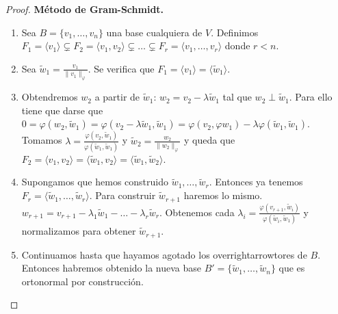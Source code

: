 \documentclass[14pt]{book}
\begin{document}
\begin{proof} \textbf{Método de Gram-Schmidt.}
	\begin{enumerate}
		\item Sea $B = \{v_1, \dots, v_n\}$ una base cualquiera de $V$. Definimos $F_1 = \langle v_1\rangle\subsetneq F_2 = \langle v_1, v_2\rangle \subsetneq \dots \subsetneq F_r = \langle v_1, \dots, v_r\rangle$ donde $r < n$.
		\item Sea $\tilde{w}_1 = \frac{v_1}{\lVert v_1\rVert_\varphi}$. Se verifica que $F_1 = \langle v_1\rangle = \langle\tilde{w}_1\rangle$.
		\item Obtendremos $w_2$ a partir de $\tilde{w}_1$: $w_2 = v_2 - \lambda \tilde{w}_1$ tal que $w_2 \perp \tilde{w}_1$. Para ello tiene que darse que $0 = \varphi(w_2, \tilde{w}_1) = \varphi(v_2 - \lambda \tilde{w}_1, \tilde{w}_1) = \varphi(v_2, \varphi{w}_1) - \lambda\varphi(\tilde{w}_1, \tilde{w}_1)$. Tomamos $\lambda = \frac{\varphi(v_2, \tilde{w}_1)}{\varphi(\tilde{w}_1, \tilde{w}_1)}$ y $\tilde{w}_2 = \frac{w_2}{\lVert w_2\rVert_\varphi}$ y queda que $F_2 = \langle v_1, v_2\rangle = \langle \tilde{w}_1, v_2\rangle = \langle \tilde{w}_1, \tilde{w}_2\rangle$.
		\item Supongamos que hemos construido $\tilde{w}_1, \dots, \tilde{w}_r$. Entonces ya tenemos $F_r = \langle \tilde{w}_1, \dots, \tilde{w}_r\rangle$. Para construir $\tilde{w}_{r+1}$ haremos lo mismo. $w_{r+1} = v_{r+1}- \lambda_1\tilde{w}_1 - \dots - \lambda_r\tilde{w}_r$. Obtenemos cada $\lambda_i = \frac{\varphi(v_{r+1}, \tilde{w}_i)}{\varphi(\tilde{w}_i, \tilde{w}_1)}$ y normalizamos para obtener $\tilde{w}_{r+1}$.
		\item  Continuamos hasta que hayamos agotado los overrightarrowtores de $B$. Entonces habremos obtenido la nueva base $B' = \{\tilde{w}_1, \dots, \tilde{w}_n\}$ que es ortonormal por construcción.
	\end{enumerate}
\end{proof}
\end{document}
